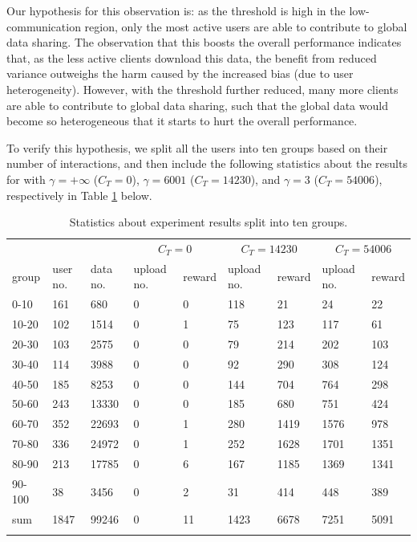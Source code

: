 Our hypothesis for this observation is: as the threshold is high in the low-communication region, only the most active users are able to contribute to global data sharing. The observation that this boosts the overall performance indicates that, as the less active clients download this data, the benefit from reduced variance outweighs the harm caused by the increased bias (due to user heterogeneity). However, with the threshold further reduced, many more clients are able to contribute to global data sharing, such that the global data would become so heterogeneous that it starts to hurt the overall performance. 
 
To verify this hypothesis, we split all the users into ten groups based on their number of interactions, and then include the following statistics about the results for \modelone{} with $\gamma=+\infty$ ($C_{T}=0$), $\gamma=6001$ ($C_{T}=14230$), and $\gamma=3$ ($C_{T}=54006$), respectively in Table \ref{tb:additional_exp} below. 
\begin{table}[ht]
\centering
\caption{Statistics about experiment results split into ten groups.}
\begin{tabular}{p{1cm} p{1.2cm} p{1.3cm} p{1.6cm} p{1cm} p{1.6cm} p{1cm} p{1.6cm} p{1cm}}
\toprule
 &  &  & \multicolumn{2}{c}{$C_T=0$} & \multicolumn{2}{c}{$C_T=14230$} & \multicolumn{2}{c}{$C_T=54006$} \\
group & user no. & data no. & upload no. & reward & upload no. & reward & upload no. & reward \\
\midrule
0-10 & 161 & 680 & 0 & 0 & 118 & 21 & 24 & 22\\
10-20 & 102 & 1514 & 0 & 1 & 75 & 123 & 117 & 61 \\
20-30 & 103 & 2575 & 0 & 0 & 79 & 214 & 202 & 103\\
30-40 & 114 & 3988 & 0 & 0 & 92 & 290 & 308 & 124\\
40-50 & 185 & 8253 & 0 & 0 & 144 & 704 & 764 & 298\\
50-60 & 243 & 13330 & 0 & 0 & 185 & 680 & 751 & 424\\
60-70 & 352 & 22693 & 0 & 1 & 280 & 1419 & 1576 & 978\\
70-80 & 336 & 24972 & 0 & 1 & 252 & 1628 & 1701 & 1351\\
80-90 & 213 & 17785 & 0 & 6 & 167 & 1185 & 1369 & 1341\\
90-100 & 38 & 3456 & 0 & 2 & 31 & 414 & 448 & 389 \\
sum & 1847 & 99246 & 0 & 11 & 1423 & 6678 & 7251 & 5091 \\
\bottomrule
\label{tb:additional_exp}
\end{tabular}
\end{table}

